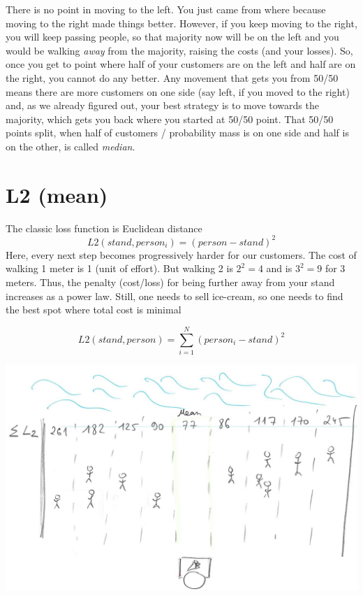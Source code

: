 \documentclass[
]{book}
\begin{document}
There is no point in moving to the left. You just came from where because moving to the right made things better. However, if you keep moving to the right, you will keep passing people, so that majority now will be on the left and you would be walking \emph{away} from the majority, raising the costs (and your losses). So, once you get to point where half of your customers are on the left and half are on the right, you cannot do any better. Any movement that gets you from 50/50 means there are more customers on one side (say left, if you moved to the right) and, as we already figured out, your best strategy is to move towards the majority, which gets you back where you started at 50/50 point. That 50/50 points split, when half of customers / probability mass is on one side and half is on the other, is called \emph{median}.

\hypertarget{l2-mean}{%
\section{L2 (mean)}\label{l2-mean}}

The classic loss function is Euclidean distance \[L2(stand, person_i) = (person - stand)^2\]
Here, every next step becomes progressively harder for our customers. The cost of walking 1 meter is 1 (unit of effort). But walking 2 is \(2^2 = 4\) and is \(3^2=9\) for 3 meters. Thus, the penalty (cost/loss) for being further away from your stand increases as a power law. Still, one needs to sell ice-cream, so one needs to find the best spot where total cost is minimal

\[L2(stand, person) = \sum_{i=1}^{N}{(person_i - stand)^2}\]

\begin{center}\includegraphics[width=1\linewidth]{images/loss-functions-L2-mean} \end{center}
\end{document}

